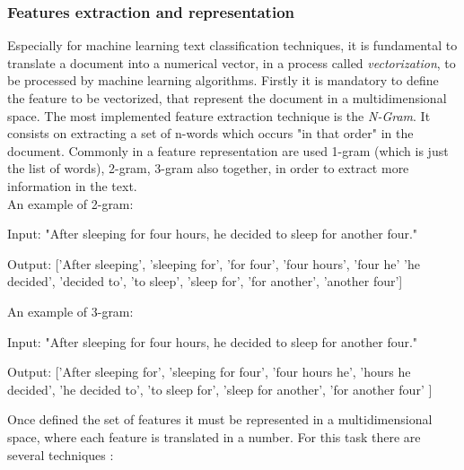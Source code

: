 \subsubsection{Features extraction and representation}
Especially for machine learning text classification techniques, it is fundamental to translate a document into a numerical vector, in a process called \textit{vectorization}, to be processed by machine learning algorithms. Firstly it is mandatory to define the feature to be vectorized, that represent the document in a multidimensional space. The most implemented feature extraction technique is the \textit{N-Gram}. It consists on extracting a set of n-words which occurs "in that order" in the document. Commonly in a feature representation are used 1-gram (which is just the list of words), 2-gram, 3-gram also together, in order to extract more information in the text.\\
An example of 2-gram:
\begin{description}
	\item Input: "After sleeping for four hours, he decided to sleep for another four."
	\item Output: ['After sleeping', 'sleeping for', 'for four', 'four hours', 'four he' 'he decided', 'decided to', 'to sleep', 'sleep for', 'for another', 'another four']
\end{description}
An example of 3-gram:
\begin{description}
	\item Input: "After sleeping for four hours, he decided to sleep for another four."
	\item Output: ['After sleeping for', 'sleeping for four', 'four hours he', 'hours he decided', 'he decided to', 'to sleep for', 'sleep for another', 'for another four' ]
\end{description}
Once defined the set of features it must be represented in a multidimensional space, where each feature is translated in a number. For this task there are several techniques \cite{DBLP:journals/corr/abs-1904-08067}:
